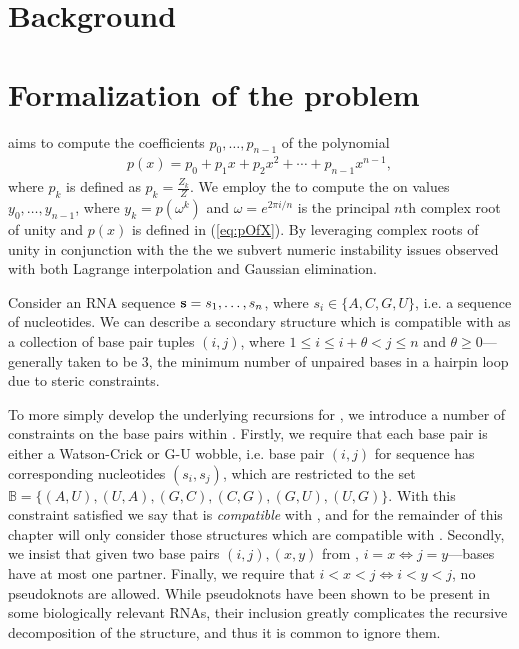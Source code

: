 \section{Background}
\label{sec:fftbor:bkgrnd}

\section{Formalization of the problem}
\label{sec:fftbor:formal}

\fftbor aims to compute the coefficients $p_0,\ldots,p_{n-1}$ of the polynomial
\begin{eqnarray}
\label{eq:pOfX}
p(x) = p_0 + p_1 x + p_2 x^2 + \cdots + p_{n-1} x^{n-1},
\end{eqnarray}
where $p_k$ is defined as $p_k = \frac{Z_k}{Z}$. We employ the \fft to compute
the \idft on values $y_0,\ldots,y_{n-1}$, where
$y_k = p(\omega^k)$ and $\omega = e^{2 \pi i/n}$ is the principal $n$th complex
root of unity and $p(x)$ is defined in (\ref{eq:pOfX}). By leveraging complex
roots of unity in conjunction with the \idft the we subvert numeric instability
issues observed with both Lagrange interpolation and Gaussian elimination.

Consider an RNA sequence ${\bf s} = s_1,\ldots,s_n$, where
$s_i \in \{A,C,G,U\}$, i.e. a sequence of nucleotides. We can describe a
secondary structure \strS which is compatible with \seq as a collection of
base pair tuples $(i,j)$, where $1 \le i \le i+\theta < j \le n$ and
$\theta \ge 0$---generally taken to be 3, the minimum number of unpaired bases
in a hairpin loop due to steric constraints.

To more simply develop the underlying recursions for \fftbor, we introduce a
number of constraints on the base pairs within \strS. Firstly, we require that
each base pair is either a Watson-Crick or G-U wobble, i.e. base pair $(i,j)$
for sequence \seq has corresponding nucleotides $(s_i,s_j)$, which are
restricted
to the set $\mathbb{B} = \{(A,U), (U,A), (G,C), (C,G), (G,U), (U,G)\}$. With
this constraint satisfied we say that \strS is {\em compatible} with \seq, and
for the remainder of this chapter will only consider those structures which are
compatible with \seq.
Secondly, we insist that given two base pairs $(i,j), (x,y)$ from \strS,
$i=x \iff j=y$---bases have at most one partner. Finally, we require that
$i<x<j \iff i<y<j$, no pseudoknots are allowed. While pseudoknots have been
shown to be present in some biologically relevant RNAs, their inclusion greatly
complicates the recursive decomposition of the structure, and thus it is common
to ignore them.

